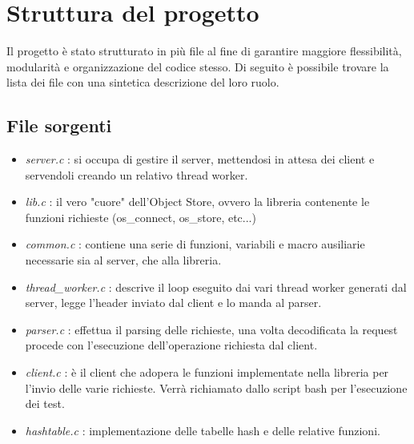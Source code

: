 \section{Struttura del progetto}
\begin{flushleft}

Il progetto è stato strutturato in più file al fine di garantire maggiore flessibilità, modularità e organizzazione del codice stesso. Di seguito è possibile trovare la lista dei file con una sintetica descrizione del loro ruolo.

\subsection{File sorgenti}
\begin{itemize}
	\item \emph{server.c} : si occupa di gestire il server, mettendosi in attesa dei client e servendoli creando un relativo thread worker.
	
	\item \emph{lib.c} : il vero "cuore" dell'Object Store, ovvero la libreria contenente le funzioni richieste (os\_connect, os\_store, etc...)
	
	\item \emph{common.c} : contiene una serie di funzioni, variabili e macro ausiliarie necessarie sia al server, che alla libreria.
	
	\item \emph{thread\_worker.c} : descrive il loop eseguito dai vari thread worker generati dal server, legge l'header inviato dal client e lo manda al parser.
	
	\item \emph{parser.c} : effettua il parsing delle richieste, una volta decodificata la request procede con l'esecuzione dell'operazione richiesta dal client.
	
	\item \emph{client.c} : è il client che adopera le funzioni implementate nella libreria per l'invio delle varie richieste. Verrà richiamato dallo script bash per l'esecuzione dei test.
	
	\item \emph{hashtable.c} : implementazione delle tabelle hash e delle relative funzioni.

\end{itemize}


\end{flushleft}


